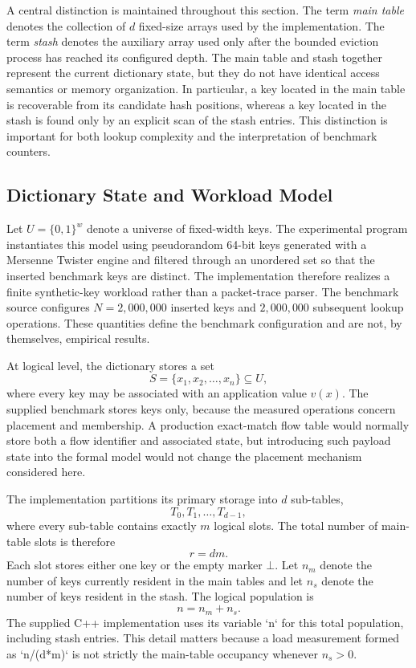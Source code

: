 \documentclass[conference]{IEEEtran}
\begin{document}
A central distinction is maintained throughout this section. The term \emph{main table} denotes the collection of $d$ fixed-size arrays used by the implementation. The term \emph{stash} denotes the auxiliary array used only after the bounded eviction process has reached its configured depth. The main table and stash together represent the current dictionary state, but they do not have identical access semantics or memory organization. In particular, a key located in the main table is recoverable from its candidate hash positions, whereas a key located in the stash is found only by an explicit scan of the stash entries. This distinction is important for both lookup complexity and the interpretation of benchmark counters.

\subsection{Dictionary State and Workload Model}

Let $U = \{0,1\}^{w}$ denote a universe of fixed-width keys. The experimental program instantiates this model using pseudorandom 64-bit keys generated with a Mersenne Twister engine and filtered through an unordered set so that the inserted benchmark keys are distinct. The implementation therefore realizes a finite synthetic-key workload rather than a packet-trace parser. The benchmark source configures $N=2{,}000{,}000$ inserted keys and $2{,}000{,}000$ subsequent lookup operations. These quantities define the benchmark configuration and are not, by themselves, empirical results. 

At logical level, the dictionary stores a set
\[
S = \{x_1,x_2,\ldots,x_n\} \subseteq U,
\]
where every key may be associated with an application value $v(x)$. The supplied benchmark stores keys only, because the measured operations concern placement and membership. A production exact-match flow table would normally store both a flow identifier and associated state, but introducing such payload state into the formal model would not change the placement mechanism considered here.

The implementation partitions its primary storage into $d$ sub-tables,
\[
T_0,T_1,\ldots,T_{d-1},
\]
where every sub-table contains exactly $m$ logical slots. The total number of main-table slots is therefore
\begin{equation}
    r = d m.
    \label{eq:main-capacity}
\end{equation}
Each slot stores either one key or the empty marker $\bot$. Let $n_m$ denote the number of keys currently resident in the main tables and let $n_s$ denote the number of keys resident in the stash. The logical population is
\begin{equation}
    n = n_m+n_s.
    \label{eq:logical-population}
\end{equation}
The supplied C++ implementation uses its variable `n` for this total population, including stash entries. This detail matters because a load measurement formed as `n/(d*m)` is not strictly the main-table occupancy whenever $n_s>0$.
\end{document}
